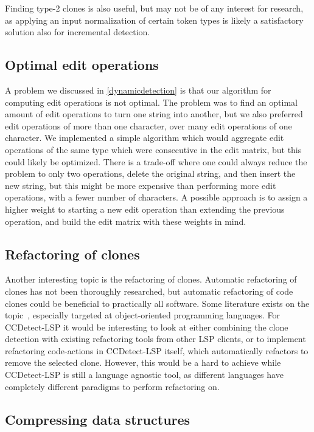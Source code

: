 Finding type-2 clones is also useful, but may not be of any interest for research, as
applying an input normalization of certain token types is likely a satisfactory solution
also for incremental detection.

\subsection*{Optimal edit operations}

A problem we discussed in \cref{dynamicdetection} is that our algorithm for computing edit
operations is not optimal. The problem was to find an optimal amount of edit operations to
turn one string into another, but we also preferred edit operations of more than one
character, over many edit operations of one character. We implemented a simple algorithm
which would aggregate edit operations of the same type which were consecutive in the edit
matrix, but this could likely be optimized. There is a trade-off where one could always
reduce the problem to only two operations, delete the original string, and then insert the
new string, but this might be more expensive than performing more edit operations, with a
fewer number of characters. A possible approach is to assign a higher weight to starting a
new edit operation than extending the previous operation, and build the edit matrix with
these weights in mind.

\subsection*{Refactoring of clones}

Another interesting topic is the refactoring of clones. Automatic refactoring of clones
has not been thoroughly researched, but automatic refactoring of code clones could be
beneficial to practically all software. Some literature exists on the
topic~\cite{TowardsAutomatedRefactoring, RefactoringOrientedClones}, especially targeted
at object-oriented programming languages. For CCDetect-LSP it would be interesting to look
at either combining the clone detection with existing refactoring tools from other LSP
clients, or to implement refactoring code-actions in CCDetect-LSP itself, which
automatically refactors to remove the selected clone. However, this would be a hard to
achieve while CCDetect-LSP is still a language agnostic tool, as different languages have
completely different paradigms to perform refactoring on.

\subsection*{Compressing data structures}

